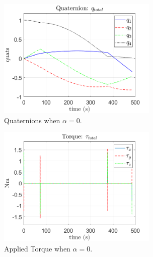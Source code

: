 \documentclass[letterpaper, preprint, paper,11pt]{AAS}	%
\begin{document}
		\begin{multicols}{2}
			\begin{figure}[H]
				\begin{center}
					\includegraphics[width=3in]{figures/alpha0/quats.png}
				\end{center}
				\caption{Quaternions when $\alpha=0$.}
				\label{fig:quats_phi_total_alpha0}
			\end{figure}
			\columnbreak
			\begin{figure}[H]
				\begin{center}
					\includegraphics[width=3in]{figures/alpha0/torque.png}
				\end{center}
				\caption{Applied Torque when $\alpha=0$.}
				\label{fig:torque_total_alpha0}
			\end{figure}
		\end{multicols}
			
	
\end{document}
